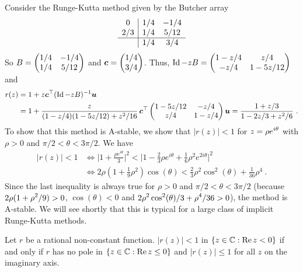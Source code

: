 \begin{egg}
Consider the Runge-Kutta method given by the Butcher array
\[
\begin{array}{c|cc}
0 & 1/4 & -1/4 \\
2/3 & 1/4 & 5/12 \\
\hline
 & 1/4 & 3/4
\end{array}
\]
So
$\displaystyle B= \begin{pmatrix} 1/4 & -1/4 \\ 1/4 & 5/12 \end{pmatrix}$
and
$\displaystyle \bm{c}= \begin{pmatrix} 1/4 \\ 3/4 \end{pmatrix}$.  Thus,
$\displaystyle \operatorname{Id}-z B
= \begin{pmatrix} 1-z/4 & z/4 \\ -z/4 & 1-5z/12 \end{pmatrix}$
and 
\begin{align*}
r(z) &= 1 +z\bm{c}^\top(\operatorname{Id}-z B)^{-1}\bm{u} \\
&= 1+ \frac{z}{(1-z/4)(1-5z/12) + z^2/16}
\,\bm{c}^\top
\begin{pmatrix}
1-5z/12 & -z/4 \\
z/4 & 1 - z/4
\end{pmatrix}
\bm{u}
= \frac{1+z/3}{1-2z/3+ z^2/6} \ .
\end{align*}
To show that this method is A-stable, we show that
$|r(z)| < 1$ for $\displaystyle z=\rho e^{i\theta}$ with $\rho>0$ and
$\pi/2 < \theta < 3\pi/2$.  We have
\begin{align*}
|r(z)| < 1 &\Leftrightarrow
\bigg| 1 + \frac{\rho e^{i\theta}}{3} \bigg|^2 <
\bigg| 1-\frac{2}{3}\rho e^{i\theta} +\frac{1}{6}\rho^2 e^{2i\theta}
\bigg|^2 \\
&\Leftrightarrow
2\rho (1+\frac{1}{9}\rho^2) \cos(\theta) <
\frac{2}{3} \rho^2 \cos^2(\theta) +\frac{1}{36} \rho^4 \ .
\end{align*}
Since the last inequality is always true for $\rho>0$ and
$\pi/2 < \theta < 3\pi/2$ (because
$\displaystyle 2\rho (1+\rho^2/9) >0$, $\cos(\theta) <0$ and
$\displaystyle 2\rho^2 \cos^2(\theta)/3 + \rho^4/36 > 0$), the
method is A-stable.  We will see shortly that this is typical for
a large class of implicit Runge-Kutta methods.
\label{AS_IRK}
\end{egg}

\begin{lemma}
Let $r$ be a rational non-constant function.  $|r(z)| <1$ in
$\{ z\in\mathbb{C} : \operatorname{Re} z<0\}$ if and only if $r$ has no pole
in $\{ z\in\mathbb{C} : \operatorname{Re} z\leq 0\}$ and $|r(z)| \leq 1$ for all $z$
on the imaginary axis.
\label{RKAstabPole}
\end{lemma}

